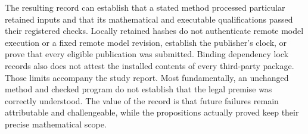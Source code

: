 The resulting record can establish that a stated method processed particular
retained inputs and that its mathematical and executable qualifications passed
their registered checks. Locally retained hashes do not authenticate remote
model execution or a fixed remote model revision, establish the publisher's
clock, or prove that every eligible
publication was submitted. Binding dependency lock records also does not
attest the installed contents of every third-party package. Those limits
accompany the study report. Most
fundamentally, an unchanged method and checked program do not establish that
the legal premise was correctly understood. The value of the record is that
future failures remain attributable and challengeable, while the propositions
actually proved keep their precise mathematical scope.
